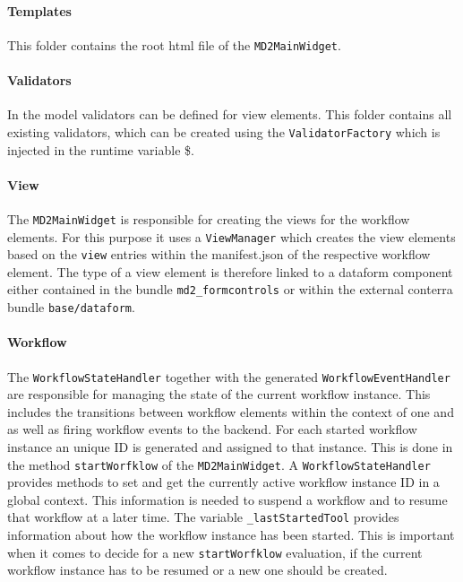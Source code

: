 \paragraph{Templates}
This folder contains the root html file of the \lstinline|MD2MainWidget|.

\paragraph{Validators}
In the model validators can be defined for view elements. This folder contains all existing validators, which can be created using the \lstinline|ValidatorFactory| which is injected in the runtime variable \$.

\paragraph{View}
The \lstinline|MD2MainWidget| is responsible for creating the views for the workflow elements. For this purpose it uses a \lstinline|ViewManager| which creates the view elements based on the \lstinline|view| entries within the manifest.json of the respective workflow element. The type of a view element is therefore linked to a dataform component either contained in the bundle \lstinline|md2_formcontrols| or within the external conterra bundle \lstinline|base/dataform|.

\paragraph{Workflow}\label{par:workflowStateHandler}
The \lstinline|WorkflowStateHandler| together with the generated \lstinline|WorkflowEventHandler| are responsible for managing the state of the current workflow instance. This includes the transitions between workflow elements within the context of one and as well as firing workflow events to the backend.  
For each started workflow instance an unique ID is generated and assigned to that instance. This is done in the method \lstinline!startWorfklow! of the \lstinline!MD2MainWidget!. A \lstinline!WorkflowStateHandler! provides methods to set and get the currently active workflow instance ID in a global context. This information is needed to suspend a workflow and to resume that workflow at a later time. The variable \lstinline|_lastStartedTool| provides information about how the workflow instance has been started. This is important when it comes to decide for a new \lstinline!startWorfklow! evaluation, if the current workflow instance has to be resumed or a new one should be created.


